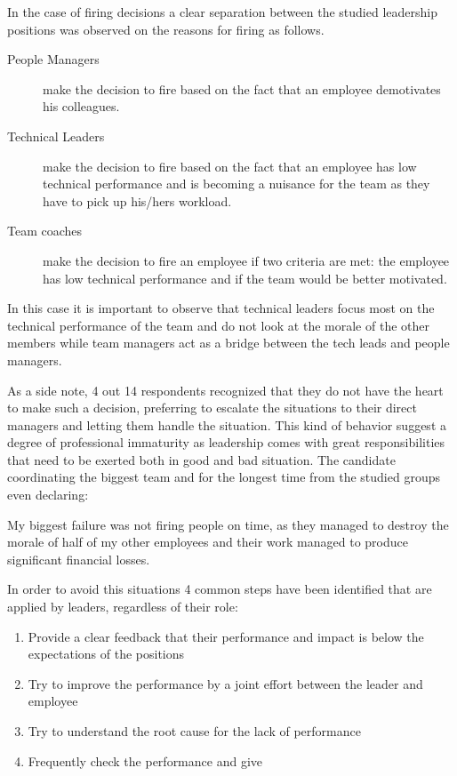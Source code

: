 In the case of firing decisions a clear separation between the studied leadership positions was observed on the reasons for firing as follows.

\begin{description}
\item [People Managers] make the decision to fire based on the fact that an employee demotivates his colleagues.
\item [Technical Leaders] make the decision to fire based on the fact that an employee has low technical performance and is becoming a nuisance for the team as they have to pick up his/hers workload.
\item [Team coaches] make the decision to fire an employee if two criteria are met: the employee has low technical performance and if the team would be better motivated.
\end{description}

In this case it is important to observe that technical leaders focus most on the technical performance of the team and do not look at the morale of the other members while team managers act as a bridge between the tech leads and people managers. 

As a side note, 4 out 14 respondents recognized that they do not have the heart to make such a decision, preferring to escalate the situations to their direct managers and letting them handle the situation. This kind of behavior suggest a degree of professional immaturity as leadership comes with great responsibilities that need to be exerted both in good and bad situation. The candidate coordinating the biggest team and for the longest time from the studied groups even declaring:

\begin{displayquote}
My biggest failure was not firing people on time, as they managed to destroy the morale of half of my other employees and their work managed to produce significant financial losses.
\end{displayquote}

In order to avoid this situations 4 common steps have been identified that are applied by leaders, regardless of their role:

\begin{enumerate}
\item Provide a clear feedback that their performance and impact is below the expectations of the positions
\item Try to improve the performance by a joint effort between the leader and employee
\item Try to understand the root cause for the lack of performance
\item Frequently check the performance and give 
\end{enumerate}

